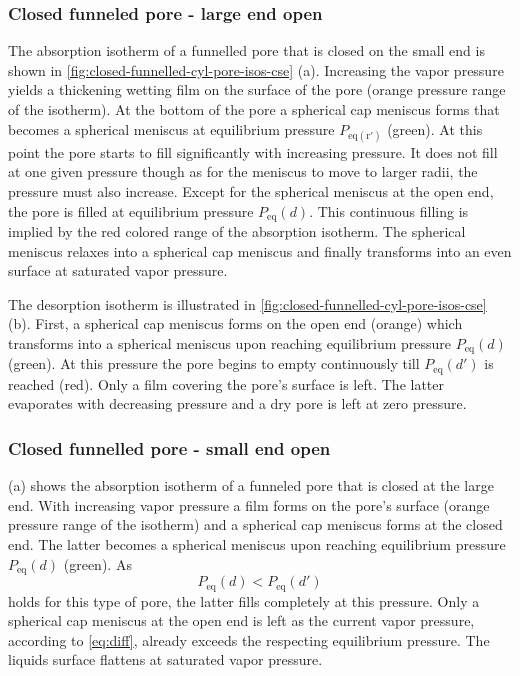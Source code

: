 \documentclass[../thesis.tex]{subfiles}
\begin{document}
            \subsubsection{Closed funneled pore - large end open}
            \label{sssec:cfp-leo}

                The absorption isotherm of a funnelled pore that is closed on the small end is shown in \cref{fig:closed-funnelled-cyl-pore-isos-cse} (a). Increasing the vapor pressure yields a thickening wetting film on the surface of the pore (orange pressure range of the isotherm). At the bottom of the pore a spherical cap meniscus forms that becomes a spherical meniscus at equilibrium pressure $P_\mathrm{{eq}(r')}$ (green). At this point the pore starts to fill significantly with increasing pressure. It does not fill at one given pressure though as for the meniscus to move to larger radii, the pressure must also increase. Except for the spherical meniscus at the open end, the pore is filled at equilibrium pressure $P_\mathrm{eq}(d)$. This continuous filling is implied by the red colored range of the absorption isotherm. The spherical meniscus relaxes into a spherical cap meniscus and finally transforms into an even surface at saturated vapor pressure.
                \medskip

                The desorption isotherm is illustrated in \cref{fig:closed-funnelled-cyl-pore-isos-cse} (b). First, a spherical cap meniscus forms on the open end (orange) which transforms into a spherical meniscus upon reaching equilibrium pressure $P_\mathrm{eq}(d)$ (green). At this pressure the pore begins to empty continuously till $P_\mathrm{eq}(d')$ is reached (red). Only a film covering the pore's surface is left. The latter evaporates with decreasing pressure and a dry pore is left at zero pressure.



            \subsubsection{Closed funnelled pore - small end open}

                 (a) shows the absorption isotherm of a funneled pore that is closed at the large end. With increasing vapor pressure a film forms on the pore's surface (orange pressure range of the isotherm) and a spherical cap meniscus forms at the closed end. The latter becomes a spherical meniscus upon reaching equilibrium pressure $P_\mathrm{eq}(d)$ (green). As
                \begin{equation}
                    P_\mathrm{eq}(d) < P_\mathrm{eq}(d')
                    \label{eq:diff}
                \end{equation}
                holds for this type of pore, the latter fills completely at this pressure. Only a spherical cap meniscus at the open end is left as the current vapor pressure, according to \cref{eq:diff}, already exceeds the respecting equilibrium pressure. The liquids surface flattens at saturated vapor pressure.
                \medskip
\end{document}
